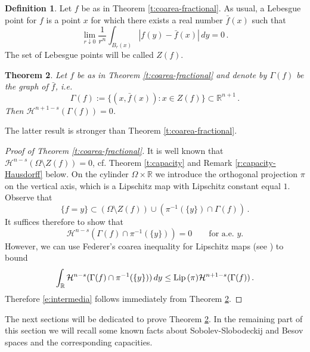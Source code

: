 \documentclass[11pt,reqno]{amsart}
\newtheorem{theorem}{Theorem}[section]
\theoremstyle{definition}
\newtheorem{definition}[theorem]{Definition}
\numberwithin{equation}{section}
\begin{document}
\begin{definition}\label{d:precise-representative}
Let $f$ be as in Theorem \ref{t:coarea-fractional}.
As usual, a Lebesgue point for $f$ is a point $x$ for which there exists a real number $\bar{f} (x)$ such that
\begin{equation}\label{e:Lebesgue}
\lim_{r\downarrow 0} \frac{1}{r^n} \int_{B_r (x)} |f(y)-\bar{f} (x)|\, dy = 0\, . 
\end{equation}
The set of Lebesgue points will be called $Z(f)$. 
\end{definition}

\begin{theorem}\label{t:graph}
Let $f$ be as in Theorem \ref{t:coarea-fractional} and denote by $\Gamma (f)$ be the graph of $\bar{f}$, i.e.
\[
\Gamma (f) := \bigl\{(x, \bar{f} (x)) : x\in Z (f) \bigr\} \subset \mathbb R^{n+1}\, .
\]
Then $\mathcal{H}^{n+1-s} (\Gamma (f)) = 0$.
\end{theorem}

The latter result is stronger than Theorem \ref{t:coarea-fractional}.

\begin{proof}[Proof of Theorem \ref{t:coarea-fractional}] 
It is well known that $\mathcal{H}^{n-s} (\Omega \setminus Z(f)) =0$, cf. Theorem \ref{t:capacity} and Remark \ref{r:capacity-Hausdorff} below. On the cylinder $\Omega \times \mathbb R$ we introduce the orthogonal projection $\pi$ on the vertical axis, which is a Lipschitz map with Lipschitz constant equal $1$. Observe that 
\[
\{f=y\} \subset (\Omega\setminus Z(f)) \cup (\pi^{-1} (\{y\}) \cap \Gamma (f))\, .
\]  
It suffices therefore to show that 
\begin{equation}\label{e:intermedia}
\mathcal{H}^{n-s} (\Gamma (f) \cap \pi^{-1} (\{y\})) = 0 \qquad \mbox{for a.e. $y$.}
\end{equation}
However, we can use Federer's coarea inequality for Lipschitz maps (see \cite[Theorem 2.10.25]{Federer}) to bound
\begin{equation}\label{e:coarea-ineq-Fed}
\int_{\mathbb R} \mathcal{H}^{n-s} (\Gamma (f) \cap \pi^{-1} (\{y\}))\, dy 
\leq {\rm Lip}\, (\pi) \mathcal{H}^{n+1-s} (\Gamma (f))\, .
\end{equation}
Therefore \eqref{e:intermedia} follows immediately from Theorem \ref{t:graph}.
\end{proof}

The next sections will be dedicated to prove Theorem \ref{t:graph}. In the remaining part of this section we will recall some known facts about Sobolev-Slobodeckij and Besov spaces and the corresponding capacities.
\end{document}
